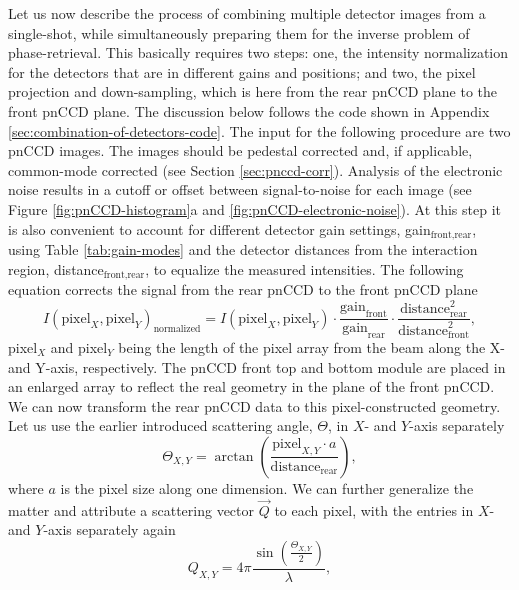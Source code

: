 %
Let us now describe the process of combining multiple detector images from a single-shot, while simultaneously preparing them for the inverse problem of phase-retrieval. This basically requires two steps: one, the intensity normalization for the detectors that are in different gains and positions; and two, the pixel projection and down-sampling, which is here from the rear pnCCD plane to the front pnCCD plane. The discussion below follows the code shown in Appendix \ref{sec:combination-of-detectors-code}. The input for the following procedure are two pnCCD images. The images should be pedestal corrected and, if applicable, common-mode corrected (see Section \ref{sec:pnccd-corr}). Analysis of the electronic noise results in a cutoff or offset between signal-to-noise for each image (see Figure \ref{fig:pnCCD-histogram}a and \ref{fig:pnCCD-electronic-noise}). At this step it is also convenient to account for different detector gain settings, gain$_{\text{front,rear}}$, using Table \ref{tab:gain-modes} and the detector distances from the interaction region, distance$_{\text{front,rear}}$, to equalize the measured intensities. The following equation corrects the signal from the rear pnCCD to the front pnCCD plane
\begin{equation}
I(\text{pixel}_{X},\text{pixel}_{Y})_{\text{normalized}} = I(\text{pixel}_{X},\text{pixel}_{Y})\cdot \frac{\text{gain}_{\text{front}}}{\text{gain}_{\text{rear}}} \cdot \frac{\text{distance}_{\text{rear}}^{2}}{\text{distance}_{\text{front}}^{2}},
\end{equation}
pixel$_{X}$ and pixel$_{Y}$ being the length of the pixel array from the beam along the X- and Y-axis, respectively. The pnCCD front top and bottom module are placed in an enlarged array to reflect the real geometry in the plane of the front pnCCD. We can now transform the rear pnCCD data to this pixel-constructed geometry. Let us use the earlier introduced scattering angle, $\Theta$, in $X$- and $Y$-axis separately
\begin{equation}
\Theta_{X,Y} = \arctan\left(\frac{\text{pixel}_{X,Y} \cdot a}{\text{distance}_{\text{rear}}}\right),
\label{eqn:scattering-angle}
\end{equation}
where $a$ is the pixel size along one dimension. We can further generalize the matter and attribute a scattering vector $\vec{Q}$ to each pixel, with the entries in $X$- and $Y$-axis separately again
\begin{equation}
Q_{X,Y} = 4 \pi \frac{\sin\left(\frac{\Theta_{X,Y}}{2}\right)}{\lambda},
\label{eqn:q-vector}
\end{equation}
